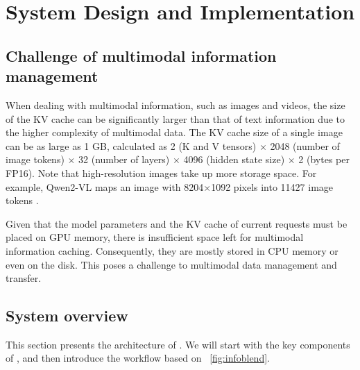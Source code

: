 \section{System Design and Implementation}
\subsection{Challenge of multimodal information management}
When dealing with multimodal information, such as images and videos, the size of the KV cache can be significantly larger than that of text information due to the higher complexity of multimodal data. The KV cache size of a single image can be as large as 1 GB, calculated as 2 (K and V tensors) $\times$ 2048 (number of image tokens) $\times$ 32 (number of layers) $\times$ 4096 (hidden state size) $\times$ 2 (bytes per FP16). Note that high-resolution images take up more storage space. For example, Qwen2-VL maps an image with 8204$\times$1092 pixels into 11427 image tokens \cite{wang2024qwen2vl}.

Given that the model parameters and the KV cache of current requests must be placed on GPU memory, there is insufficient space left for multimodal information caching. Consequently, they are mostly stored in CPU memory or even on the disk. This poses a challenge to multimodal data management and transfer.
\subsection{System overview}
This section presents the architecture of \sys. We will start with the key components of \sys, and then introduce the workflow based on \figurename~\ref{fig:infoblend}.

